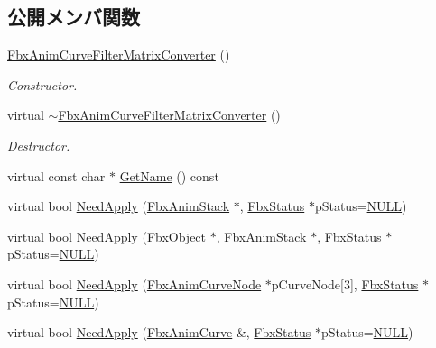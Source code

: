 \subsection*{公開メンバ関数}
\begin{DoxyCompactItemize}
\item 
\hyperlink{class_fbx_anim_curve_filter_matrix_converter_a756dc5898f25c94c6887a6fcf9b14f97}{Fbx\+Anim\+Curve\+Filter\+Matrix\+Converter} ()
\begin{DoxyCompactList}\small\item\em Constructor. \end{DoxyCompactList}\item 
virtual \hyperlink{class_fbx_anim_curve_filter_matrix_converter_ab87ad3901de6754e782e1b923ffa1399}{$\sim$\+Fbx\+Anim\+Curve\+Filter\+Matrix\+Converter} ()
\begin{DoxyCompactList}\small\item\em Destructor. \end{DoxyCompactList}\item 
virtual const char $\ast$ \hyperlink{class_fbx_anim_curve_filter_matrix_converter_a264eb163214f398627f4b8e20631b1ab}{Get\+Name} () const
\item 
virtual bool \hyperlink{class_fbx_anim_curve_filter_matrix_converter_ad19ed98d377e10fb85c20454dbbadaae}{Need\+Apply} (\hyperlink{class_fbx_anim_stack}{Fbx\+Anim\+Stack} $\ast$, \hyperlink{class_fbx_status}{Fbx\+Status} $\ast$p\+Status=\hyperlink{fbxarch_8h_a070d2ce7b6bb7e5c05602aa8c308d0c4}{N\+U\+LL})
\item 
virtual bool \hyperlink{class_fbx_anim_curve_filter_matrix_converter_a8f4e811fedfacc4bc5a90942d2a2bfd5}{Need\+Apply} (\hyperlink{class_fbx_object}{Fbx\+Object} $\ast$, \hyperlink{class_fbx_anim_stack}{Fbx\+Anim\+Stack} $\ast$, \hyperlink{class_fbx_status}{Fbx\+Status} $\ast$p\+Status=\hyperlink{fbxarch_8h_a070d2ce7b6bb7e5c05602aa8c308d0c4}{N\+U\+LL})
\item 
virtual bool \hyperlink{class_fbx_anim_curve_filter_matrix_converter_a640fa8192c330f999894be8083ec578f}{Need\+Apply} (\hyperlink{class_fbx_anim_curve_node}{Fbx\+Anim\+Curve\+Node} $\ast$p\+Curve\+Node\mbox{[}3\mbox{]}, \hyperlink{class_fbx_status}{Fbx\+Status} $\ast$p\+Status=\hyperlink{fbxarch_8h_a070d2ce7b6bb7e5c05602aa8c308d0c4}{N\+U\+LL})
\item 
virtual bool \hyperlink{class_fbx_anim_curve_filter_matrix_converter_aa7105a07dbaf0d9598fa930ff2b3141d}{Need\+Apply} (\hyperlink{class_fbx_anim_curve}{Fbx\+Anim\+Curve} \&, \hyperlink{class_fbx_status}{Fbx\+Status} $\ast$p\+Status=\hyperlink{fbxarch_8h_a070d2ce7b6bb7e5c05602aa8c308d0c4}{N\+U\+LL})

\end{DoxyCompactItemize}
